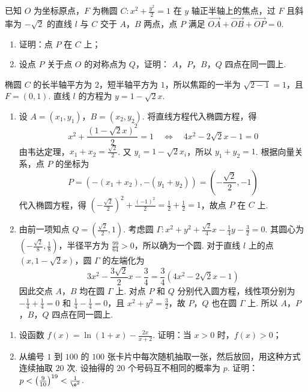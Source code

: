 \begin{problem}
已知 \(O\) 为坐标原点，\(F\) 为椭圆 \(C: x^2 + \frac{y^2}{2} = 1\) 在 \(y\) 轴正半轴上的焦点，过 \(F\) 且斜率为 \(-\sqrt{2}\) 的直线 \(l\) 与 \(C\) 交于 \(A\)，\(B\) 两点，点 \(P\) 满足 \(\overrightarrow{OA} + \overrightarrow{OB} + \overrightarrow{OP} = 0\).
\begin{enumerate}
\item 证明：点 \(P\) 在 \(C\) 上；
\item 设点 \(P\) 关于点 \(O\) 的对称点为 \(Q\)，证明： \(A\)，\(P\)，\(B\)，\(Q\) 四点在同一圆上.
\end{enumerate}
\end{problem}

\begin{solution}
椭圆 \(C\) 的长半轴平方为 \(2\)，短半轴平方为 \(1\)，所以焦距的一半为 \(\sqrt{2-1}=1\)，且 \(F=(0,1)\). 直线 \(l\) 的方程为 \(y=1-\sqrt{2}x\).

\begin{enumerate}
\item 设 \(A=(x_1,y_1)\)，\(B=(x_2,y_2)\). 将直线方程代入椭圆方程，得
\[
x^2+\frac{(1-\sqrt{2}x)^2}{2}=1\quad\Longleftrightarrow\quad 4x^2-2\sqrt{2}x-1=0
\]
由韦达定理，\(x_1+x_2=\frac{\sqrt{2}}2\). 又 \(y_i=1-\sqrt{2}x_i\)，所以 \(y_1+y_2=1\). 根据向量关系，点 \(P\) 的坐标为
\[
P=\left(-(x_1+x_2),-(y_1+y_2)\right)=\left(-\frac{\sqrt{2}}2,-1\right)
\]
代入椭圆方程，得 \(\left(-\frac{\sqrt{2}}2\right)^2+\frac{(-1)^2}{2}=\frac12+\frac12=1\)，故点 \(P\) 在 \(C\) 上.

\item 由前一项知点 \(Q=\left(\frac{\sqrt{2}}2,1\right)\). 考虑圆 \(\Gamma: x^2+y^2+\frac{\sqrt{2}}4x-\frac14y-\frac32=0\).
其圆心为 \(\left(-\frac{\sqrt{2}}8,\frac18\right)\)，半径平方为 \(\frac{99}{64}>0\)，所以确为一个圆. 对于直线 \(l\) 上的点 \((x,1-\sqrt{2}x)\)，圆 \(\Gamma\) 的左端化为
\[
3x^2-\frac{3\sqrt{2}}2x-\frac34=\frac34\left(4x^2-2\sqrt{2}x-1\right)
\]
因此交点 \(A\)，\(B\) 均在圆 \(\Gamma\) 上. 对点 \(P\) 和 \(Q\) 分别代入圆方程，线性项分别为 \(-\frac14+\frac14=0\) 和 \(\frac14-\frac14=0\)，且 \(x^2+y^2=\frac32\)，故 \(P\)，\(Q\) 也在圆 \(\Gamma\) 上. 所以 \(A\)，\(P\)，\(B\)，\(Q\) 四点在同一圆上.
\end{enumerate}
\end{solution}


\begin{problem}
\begin{enumerate}
\item 设函数 \( f(x) = \ln (1 + x) - \frac{2x}{x + 2} \). 证明：当 \( x > 0 \) 时，\( f(x) > 0 \)；
\item 从编号 \(1\) 到 \(100\) 的 \(100\) 张卡片中每次随机抽取一张，然后放回，用这种方式连续抽取 \(20\) 次. 设抽得的 \(20\) 个号码互不相同的概率为 \(p\). 证明：\(p < \left(\frac{9}{10}\right)^{19} < \frac{1}{\e^2}\).
\end{enumerate}
\end{problem}


